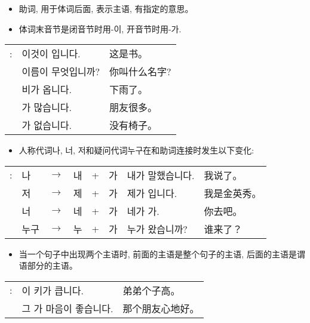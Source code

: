 \begin{grammar}
	\begin{grammarsect}[\kr -이 / -가]
		\begin{itemize}
			\item 助词, 用于体词后面, 表示主语, 有指定的意思。
			\item 体词末音节是闭音节时用{\kr -이}, 开音节时用{\kr -가}.
		\end{itemize}
		\begin{tabular}{lll}
			\kr \ruby{例}{예}: & \kr 이것이 \ruby{冊}{책}입니다.  & 这是书。    \\
			                 & \kr 이름이 무엇입니까?           & 你叫什么名字? \\
			                 & \kr 비가 옵니다.              & 下雨了。    \\
			                 & \kr \ruby{親舊}{친구}가 많습니다. & 朋友很多。   \\
			                 & \kr \ruby{椅子}{의자}가 없습니다. & 没有椅子。
		\end{tabular}
		\begin{itemize}
			\item 人称代词{\kr 나, 너, 저}和疑问代词{\kr 누구}在和助词连接时发生以下变化:
		\end{itemize}
		\begin{tabular}{llllllll}
			\kr \ruby{例}{예}: & \kr 나  & $\to$ & \kr 내 & + & \kr 가 & \kr 내가 말했습니다.              & 我说了。   \\
			                 & \kr 저  & $\to$ & \kr 제 & + & \kr 가 & \kr 제가 \ruby{金英秀}{김영수}입니다. & 我是金英秀。 \\
			                 & \kr 너  & $\to$ & \kr 네 & + & \kr 가 & \kr 네가 가.                  & 你去吧。   \\
			                 & \kr 누구 & $\to$ & \kr 누 & + & \kr 가 & \kr 누가 왔습니까?               & 谁来了？   \\
		\end{tabular}
		\begin{itemize}
			\item 当一个句子中出现两个主语时, 前面的主语是整个句子的主语, 后面的主语是谓语部分的主语。
		\end{itemize}
		\begin{tabular}{lll}
			\kr \ruby{例}{예}: & \kr \ruby{同生}{동생}이 키가 큽니다.     & 弟弟个子高。     \\
			                 & \kr 그 \ruby{親舊}{친구}가 마음이 좋습니다. & 那个朋友心地好。   \\

\end{tabular}
\end{grammarsect}
\end{grammar}
